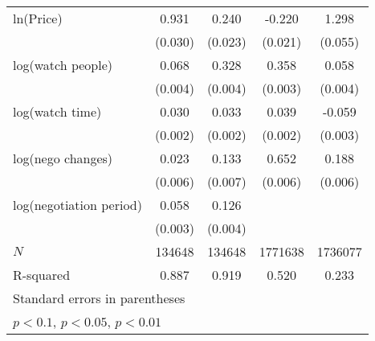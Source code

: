 {\begin{tabular}{l*{4}{c}}
\addlinespace
ln(Price)&       0.931\sym{***}&       0.240\sym{***}&      -0.220\sym{***}&       1.298\sym{***}\\
            &     (0.030)         &     (0.023)         &     (0.021)         &     (0.055)         \\
\addlinespace
log(watch people)&       0.068\sym{***}&       0.328\sym{***}&       0.358\sym{***}&       0.058\sym{***}\\
            &     (0.004)         &     (0.004)         &     (0.003)         &     (0.004)         \\
\addlinespace
log(watch time)&       0.030\sym{***}&       0.033\sym{***}&       0.039\sym{***}&      -0.059\sym{***}\\
            &     (0.002)         &     (0.002)         &     (0.002)         &     (0.003)         \\
\addlinespace
log(nego changes)&       0.023\sym{***}&       0.133\sym{***}&       0.652\sym{***}&       0.188\sym{***}\\
            &     (0.006)         &     (0.007)         &     (0.006)         &     (0.006)         \\
\addlinespace
log(negotiation period)&       0.058\sym{***}&       0.126\sym{***}&                     &                     \\
            &     (0.003)         &     (0.004)         &                     &                     \\
\midrule
\(N\)       &      134648         &      134648         &     1771638         &     1736077         \\
R-squared   &       0.887         &       0.919         &       0.520         &       0.233         \\
\bottomrule
\multicolumn{5}{l}{\footnotesize Standard errors in parentheses}\\
\multicolumn{5}{l}{\footnotesize \sym{*} \(p<0.1\), \sym{**} \(p<0.05\), \sym{***} \(p<0.01\)}\\
\end{tabular}
}
